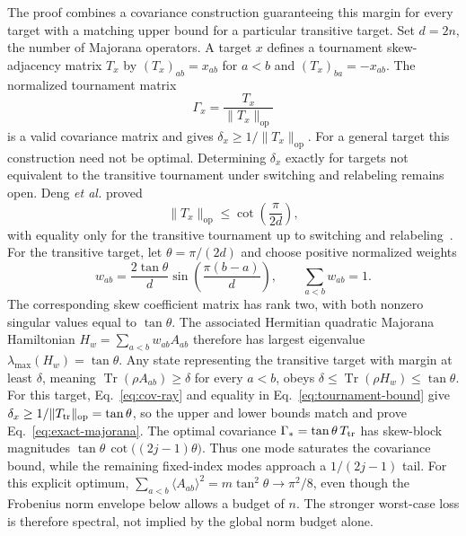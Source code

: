 \documentclass[10pt,aps,pra,twocolumn,superscriptaddress,nofootinbib,longbibliography]{revtex4-2}
\newcommand{\Tr}{\operatorname{Tr}}
\newcommand{\op}{\mathrm{op}}
\begin{document}
The proof combines a covariance construction guaranteeing this margin for every target with a matching upper bound for a particular transitive target.  Set $d=2n$, the number of Majorana operators.  A target $x$ defines a tournament skew-adjacency matrix $T_x$ by $(T_x)_{ab}=x_{ab}$ for $a<b$ and $(T_x)_{ba}=-x_{ab}$.  The normalized tournament matrix
\begin{equation}
    \Gamma_x=\frac{T_x}{\|T_x\|_{\op}}
    \label{eq:cov-ray}
\end{equation}
is a valid covariance matrix and gives $\delta_x\ge1/\|T_x\|_{\op}$.  For a general target this construction need not be optimal.  Determining $\delta_x$ exactly for targets not equivalent to the transitive tournament under switching and relabeling remains open.  Deng \emph{et al.} proved
\begin{equation}
    \|T_x\|_{\op}\le \cot\!\left(\frac{\pi}{2d}\right),
    \label{eq:tournament-bound}
\end{equation}
with equality only for the transitive tournament up to switching and relabeling~\cite{Deng2018Tournament}.  For the transitive target, let $\theta=\pi/(2d)$ and choose positive normalized weights
\begin{equation}
    w_{ab}=\frac{2\tan\theta}{d}\sin\!\left(\frac{\pi(b-a)}{d}\right),
    \qquad \sum_{a<b}w_{ab}=1.
    \label{eq:certificate-weights}
\end{equation}
The corresponding skew coefficient matrix has rank two, with both nonzero singular values equal to $\tan\theta$.  The associated Hermitian quadratic Majorana Hamiltonian $H_w=\sum_{a<b}w_{ab}A_{ab}$ therefore has largest eigenvalue $\lambda_{\max}(H_w)=\tan\theta$.  Any state representing the transitive target with margin at least $\delta$, meaning $\Tr(\rho A_{ab})\ge\delta$ for every $a<b$, obeys $\delta\le\Tr(\rho H_w)\le\tan\theta$.  For this target, Eq.~\eqref{eq:cov-ray} and equality in Eq.~\eqref{eq:tournament-bound} give $\delta_x\ge1/\|T_{\rm tr}\|_{\op}=\tan\theta$, so the upper and lower bounds match and prove Eq.~\eqref{eq:exact-majorana}.  The optimal covariance $\Gamma_*=\tan\theta\,T_{\rm tr}$ has skew-block magnitudes $\tan\theta\,\cot\!\bigl((2j-1)\theta\bigr)$.  Thus one mode saturates the covariance bound, while the remaining fixed-index modes approach a $1/(2j-1)$ tail.  For this explicit optimum, $\sum_{a<b}\langle A_{ab}\rangle^2=m\tan^2\theta\to\pi^2/8$, even though the Frobenius norm envelope below allows a budget of $n$.  The stronger worst-case loss is therefore spectral, not implied by the global norm budget alone.
\end{document}
